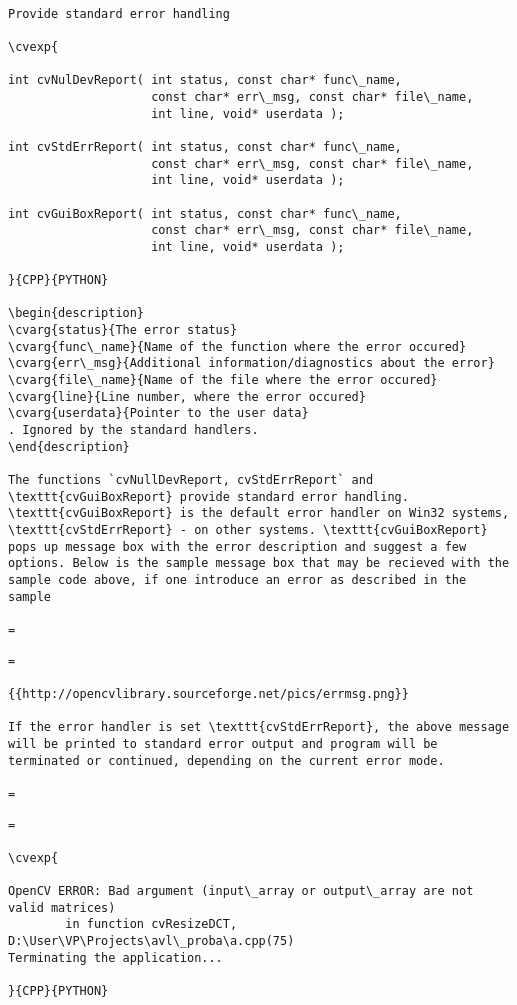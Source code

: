\begin{verbatim}

Provide standard error handling

\cvexp{

int cvNulDevReport( int status, const char* func\_name,
                    const char* err\_msg, const char* file\_name,
                    int line, void* userdata );

int cvStdErrReport( int status, const char* func\_name,
                    const char* err\_msg, const char* file\_name,
                    int line, void* userdata );

int cvGuiBoxReport( int status, const char* func\_name,
                    const char* err\_msg, const char* file\_name,
                    int line, void* userdata );

}{CPP}{PYTHON}

\begin{description}
\cvarg{status}{The error status}
\cvarg{func\_name}{Name of the function where the error occured}
\cvarg{err\_msg}{Additional information/diagnostics about the error}
\cvarg{file\_name}{Name of the file where the error occured}
\cvarg{line}{Line number, where the error occured}
\cvarg{userdata}{Pointer to the user data}
. Ignored by the standard handlers.
\end{description}

The functions `cvNullDevReport, cvStdErrReport` and \texttt{cvGuiBoxReport} provide standard error handling. \texttt{cvGuiBoxReport} is the default error handler on Win32 systems, \texttt{cvStdErrReport} - on other systems. \texttt{cvGuiBoxReport} pops up message box with the error description and suggest a few options. Below is the sample message box that may be recieved with the sample code above, if one introduce an error as described in the sample

=\end{verbatim}
\label{Error Message Box}
\begin{verbatim}=

{{http://opencvlibrary.sourceforge.net/pics/errmsg.png}}

If the error handler is set \texttt{cvStdErrReport}, the above message will be printed to standard error output and program will be terminated or continued, depending on the current error mode.

=\end{verbatim}
\begin{verbatim}=

\cvexp{

OpenCV ERROR: Bad argument (input\_array or output\_array are not valid matrices)
        in function cvResizeDCT, D:\User\VP\Projects\avl\_proba\a.cpp(75)
Terminating the application...

}{CPP}{PYTHON}


\end{verbatim}
